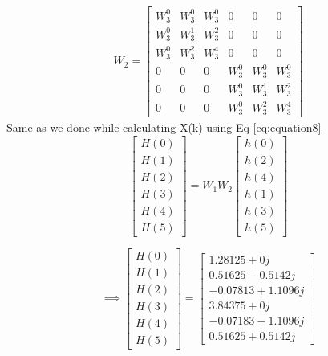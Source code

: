\documentclass[journal,12pt,twocolumn]{IEEEtran}
\renewcommand\thesection{\arabic{section}}
\begin{document}
\begin{enumerate}[label=\thesection.\arabic*.,ref=\thesection.\theenumi]
\begin{align}
W_{2} = 
\begin{bmatrix}
W^{0}_{3} & W^{0}_{3} & W^{0}_{3} & 0 & 0 & 0\\
W^{0}_{3} & W^{1}_{3} & W^{2}_{3} & 0 & 0 & 0\\
W^{0}_{3} & W^{2}_{3} & W^{4}_{3} & 0 & 0 & 0\\
0 & 0 & 0 & W^{0}_{3} & W^{0}_{3} & W^{0}_{3}\\
0 & 0 & 0 & W^{0}_{3} & W^{1}_{3} & W^{2}_{3}\\
0 & 0 & 0 & W^{0}_{3} & W^{2}_{3} & W^{4}_{3}
\end{bmatrix}
\end{align}
Same as we done while calculating X(k) using Eq \eqref{eq:equation8}
\begin{equation}
\begin{bmatrix} 
H(0) \\ 
H(1) \\ 
H(2) \\ 
H(3) \\ 
H(4) \\ 
H(5) 
\end{bmatrix}
=
W_{1}W_{2}
\begin{bmatrix}
h(0) \\ 
h(2) \\ 
h(4) \\ 
h(1) \\ 
h(3) \\ 
h(5)
\end{bmatrix}
\end{equation}


\begin{equation}
\implies
\begin{bmatrix} 
H(0) \\ 
H(1) \\ 
H(2) \\ 
H(3) \\ 
H(4) \\ 
H(5) 
\end{bmatrix}
=
\begin{bmatrix}
1.28125+0j \\
0.51625-0.5142j \\ 
-0.07813+1.1096j  \\ 
3.84375+0j \\ 
-0.07183-1.1096j \\ 
0.51625+0.5142j
\end{bmatrix}
\end{equation}



\end{enumerate}
\end{document}
